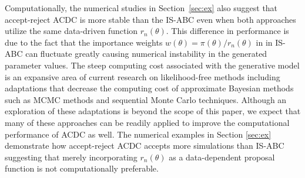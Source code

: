 Computationally, the numerical studies in Section~\ref{sec:ex} also suggest that 
accept-reject ACDC is more stable than the IS-ABC even when both approaches utilize the same data-driven function $r_{n}(\theta)$. This difference in performance is due to the fact that the importance weights  $w(\theta)=\pi(\theta)/r_{n}(\theta)$ in in IS-ABC can fluctuate greatly causing numerical instability in the generated parameter values. 
The steep computing cost associated with the generative model is an expansive area of current research on likelihood-free methods including adaptations that decrease the computing cost of approximate Bayesian methods such as MCMC methods \cite[]{marjoram2003markov} and sequential Monte Carlo techniques\cite[]{Sisson2007}. Although an exploration of these adaptations is beyond the scope of this paper, we expect that many of these approaches can be readily applied to improve the computational performance of ACDC as well. 
The numerical examples in Section \ref{sec:ex} demonstrate how accept-reject ACDC accepts more simulations than IS-ABC suggesting that merely incorporating $r_n(\theta)$ as a data-dependent proposal function is not computationally preferable. 



	
